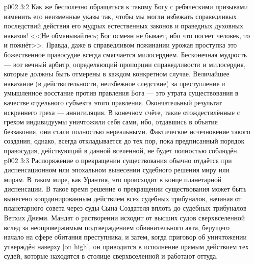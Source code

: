 \vs p002 3:2 \pc Как же бесполезно обращаться к такому Богу с ребяческими призывами изменить его неизменные указы так, чтобы мы могли избежать справедливых последствий действия его мудрых естественных законов и праведных духовных наказов! <<Не обманывайтесь; Бог осмеян не бывает, ибо что посеет человек, то и пожнёт>>. Правда, даже в справедливом пожинании урожая проступка это божественное правосудие всегда смягчается милосердием. Бесконечная мудрость --- вот вечный арбитр, определяющий пропорции справедливости и милосердия, которые должны быть отмерены в каждом конкретном случае. Величайшее наказание (в действительности, неизбежное следствие) за преступление и умышленное восстание против правления Бога --- это утрата существования в качестве отдельного субъекта этого правления. Окончательный результат искреннего греха --- аннигиляция. В конечном счёте, такие отождествлённые с грехом индивидуумы уничтожили себя сами, ибо, отдавшись в объятия беззакония, они стали полностью нереальными. Фактическое исчезновение такого создания, однако, всегда откладывается до тех пор, пока предписанный порядок правосудия, действующий в данной вселенной, не будет полностью соблюдён.
\vs p002 3:3 Распоряжение о прекращении существования обычно отдаётся при диспенсационном или эпохальном вынесении судебного решения миру или мирам. В таком мире, как Урантия, это происходит в конце планетарной диспенсации. В такое время решение о прекращении существования может быть вынесено координированным действием всех судебных трибуналов, начиная от планетарного совета через суды Сына Создателя вплоть до судебных трибуналов Ветхих Днями. Мандат о растворении исходит от высших судов сверхвселенной вслед за неопровержимым подтверждением обвинительного акта, берущего начало на сфере обитания преступника; и затем, когда приговор об уничтожении утверждён наверху [on high], он приводится в исполнение прямым действием тех судей, которые находятся в столице сверхвселенной и работают оттуда.
